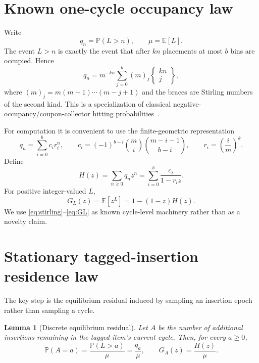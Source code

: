 \documentclass[11pt]{article}
\newtheorem{lemma}{Lemma}
\newcommand{\E}{\mathbb{E}}
\newcommand{\Prb}{\mathbb{P}}
\begin{document}
\section{Known one-cycle occupancy law}
Write
\[
q_n=\Prb(L>n),\qquad \mu=\E[L].
\]
The event $L>n$ is exactly the event that after $kn$ placements at most $b$ bins are occupied. Hence
\begin{equation}
q_n
=m^{-kn}\sum_{j=0}^{b}(m)_j
\left\{\!\!\begin{matrix}kn\\j\end{matrix}\!\!\right\},
\label{eq:stirling}
\end{equation}
where $(m)_j=m(m-1)\cdots(m-j+1)$ and the braces are Stirling numbers of the second kind. This is a specialization of classical negative-occupancy/coupon-collector hitting probabilities~\cite{oneill2022}.

For computation it is convenient to use the finite-geometric representation
\begin{equation}
q_n=\sum_{i=0}^{b}c_i r_i^n,
\qquad
c_i=(-1)^{b-i}\binom mi\binom{m-i-1}{b-i},
\qquad
r_i=\left(\frac{i}{m}\right)^k.
\label{eq:geomtail}
\end{equation}
Define
\begin{equation}
H(z)=\sum_{n\ge0}q_nz^n
=\sum_{i=0}^{b}\frac{c_i}{1-r_i z}.
\label{eq:H}
\end{equation}
For positive integer-valued $L$,
\begin{equation}
G_L(z)=\E[z^L]=1-(1-z)H(z).
\label{eq:GL}
\end{equation}
We use \eqref{eq:stirling}--\eqref{eq:GL} as known cycle-level machinery rather than as a novelty claim.

\section{Stationary tagged-insertion residence law}
The key step is the equilibrium residual induced by sampling an insertion epoch rather than sampling a cycle.

\begin{lemma}[Discrete equilibrium residual]
Let $A$ be the number of additional insertions remaining in the tagged item's current cycle. Then, for every $a\ge0$,
\begin{equation}
\Prb(A=a)=\frac{\Prb(L>a)}{\mu}=\frac{q_a}{\mu},
\qquad
G_A(z)=\frac{H(z)}{\mu}.
\label{eq:residual}
\end{equation}
\end{lemma}
\end{document}
